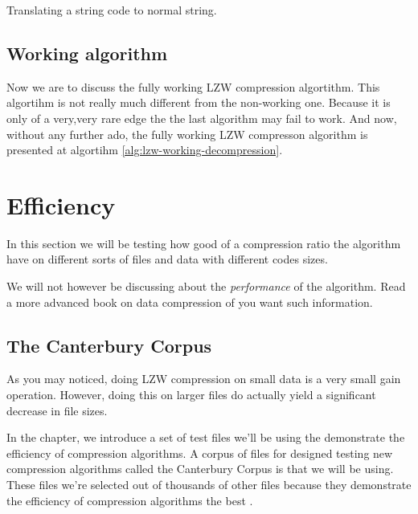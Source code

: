 \begin{refsection}
\begin{algorithm}[H]
  \caption{Translating a string code to normal string.}
  \label{alg:translate-string-code}
  \begin{algorithmic}[1]
    \While{\True}

        \Break
      \Else
      \EndIf
    \EndWhile
  \end{algorithmic}
\end{algorithm}

\subsection{Working algorithm}

Now we are to discuss the fully working LZW compression
algortithm. This algortihm is not really much different from the
non-working one. Because it is only of a very,very rare edge the the
last algorithm may fail to work. And now, without any further ado, the
fully working LZW compresson algorithm is presented at algortihm
\ref{alg:lzw-working-decompression}.


\section{Efficiency}

In this section we will be testing how good of a compression ratio the
\lzw algorithm have on different sorts of files and data with
different codes sizes.

We will not however be discussing about the \textit{performance} of
the algorithm. Read a more advanced book on data compression of you
want such information.

\subsection{The Canterbury Corpus}

As you may noticed, doing LZW compression on small data is a very small
gain operation. However, doing this on larger files do actually yield a
significant decrease in file sizes.

In the chapter, we introduce a set of test files we'll be using the
demonstrate the efficiency of compression algorithms. A corpus of
files for designed testing new compression algorithms called the
Canterbury Corpus is that we will be using. These files we're selected
out of thousands of other files because they demonstrate the
efficiency of compression algorithms the best \cite{arnold:corpus}.


\end{refsection}

